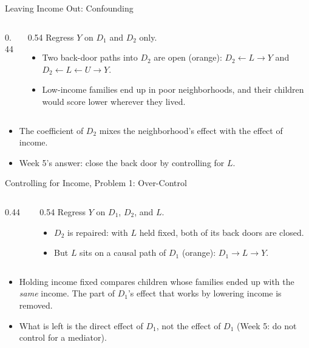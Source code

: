 \documentclass[aspectratio=169,11pt,xcolor=dvipsnames]{beamer}
\begin{document}
\begin{frame}{Leaving Income Out: Confounding}
\begin{columns}[c]
\begin{column}{0.44\linewidth}
\begin{center}
\end{center}
\end{column}
\begin{column}{0.54\linewidth}
Regress $Y$ on $D_1$ and $D_2$ only.
\begin{itemize}\itemsep4pt
  \item Two back-door paths into $D_2$ are open (orange):
        $D_2 \leftarrow L \to Y$ and $D_2 \leftarrow L \leftarrow U \to Y$.
  \item Low-income families end up in poor neighborhoods, and their children would score lower
        wherever they lived.
\end{itemize}
\end{column}
\end{columns}
\vskip6pt
\begin{itemize}\itemsep4pt
  \item The coefficient of $D_2$ mixes the neighborhood's effect with the effect of income.
  \item Week 5's answer: close the back door by controlling for $L$.
\end{itemize}
\end{frame}

\begin{frame}{Controlling for Income, Problem 1: Over-Control}
\begin{columns}[c]
\begin{column}{0.44\linewidth}
\begin{center}
\end{center}
\end{column}
\begin{column}{0.54\linewidth}
Regress $Y$ on $D_1$, $D_2$, and $L$.
\begin{itemize}\itemsep4pt
  \item $D_2$ is repaired: with $L$ held fixed, both of its back doors are closed.
  \item But $L$ sits on a causal path of $D_1$ (orange): $D_1 \to L \to Y$.
\end{itemize}
\end{column}
\end{columns}
\vskip6pt
\begin{itemize}\itemsep4pt
  \item Holding income fixed compares children whose families ended up with the \emph{same} income.
        The part of $D_1$'s effect that works by lowering income is removed.
  \item What is left is the direct effect of $D_1$, not the effect of $D_1$ (Week 5: do not control
        for a mediator).
\end{itemize}
\end{frame}
\end{document}
